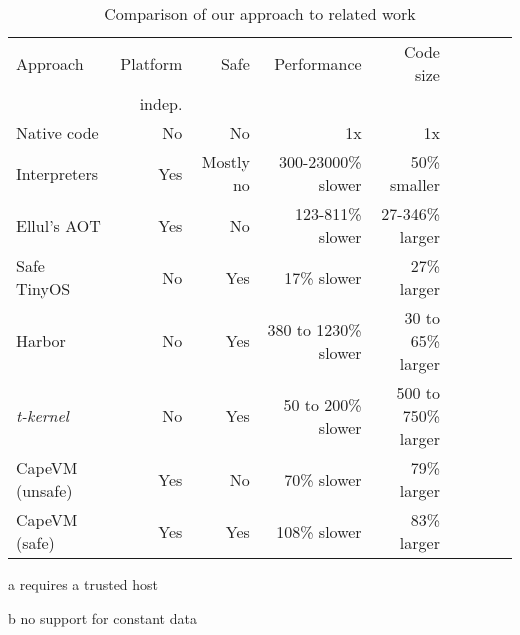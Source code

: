 \begin{table}
\caption{Comparison of our approach to related work}
\label{tbl-contribution-comparison}
    \begin{threeparttable}
    \begin{tabular}{lrrrrrrrr} %
    \toprule
    Approach          & Platform    & Safe               & Performance           & Code size                  \\
                      & indep.      &                    &                       &                            \\
    \midrule
    \midrule
    Native code       & No          & No                 & 1x                    & 1x                         \\
    Interpreters      & Yes         & Mostly no          & 300-23000\% slower    & ~50\% smaller \tnote{b}    \\ 
    Ellul's AOT       & Yes         & No                 & 123-811\% slower      & 27-346\% larger \tnote{b}  \\
    Safe TinyOS       & No          & Yes \tnote{a}      & 17\% slower           & 27\% larger                \\
    Harbor            & No          & Yes                & 380 to 1230\% slower  & 30 to 65\% larger          \\
    \emph{t-kernel}   & No          & Yes                & 50 to 200\% slower    & 500 to 750\% larger        \\
    CapeVM (unsafe)   & Yes         & No                 & 70\% slower           & 79\% larger                \\ %
    CapeVM (safe)     & Yes         & Yes                & 108\% slower          & 83\% larger                \\ %
    \bottomrule
    \end{tabular}
    \begin{tablenotes}
        \item[a] requires a trusted host
        \item[b] no support for constant data
    \end{tablenotes}
    \end{threeparttable}
\end{table}
